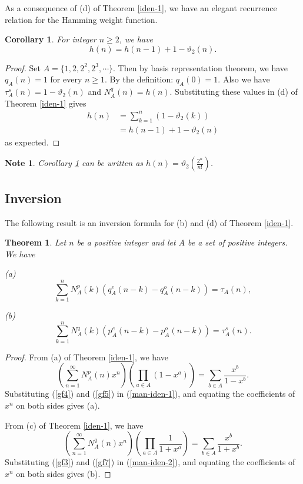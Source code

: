 \documentclass[11pt]{article}
\newtheorem{theorem}{Theorem}
\newtheorem{corollary}{Corollary}
\newtheorem{note}{Note}
\begin{document}
As a consequence of (d) of Theorem \ref{iden-1}, we have an elegant recurrence relation for the Hamming weight function.
\begin{corollary}\label{ham-rec}
For integer $n\geq 2$, we have
\begin{equation}
h(n)=h(n-1)+1-\vartheta_2(n).
\end{equation}
\end{corollary}
\begin{proof}
Set $A=\{1,2,2^2,2^3,\cdots \}$. Then by basis representation theorem, we have $q_A(n)=1$ for every $n\geq 1$. By the definition: $q_A(0)=1$. Also we have $\tau_A^s(n)=1-\vartheta_2(n)$ and $N_A^q(n)=h(n)$. Substituting these values in (d) of Theorem \ref{iden-1} gives 
\begin{align*}
h(n)&=\sum_{k=1}^{n}(1-\vartheta_2(k))\\
&=h(n-1)+1-\vartheta_2(n)
\end{align*}
as expected. 
\end{proof}
\begin{note}
Corollary \ref{ham-rec} can be written as $h(n)=\vartheta_2\left(\frac{2^{n}}{n!}\right)$.
\end{note}
\subsection{ Inversion}
The following result is an inversion formula for (b) and (d) of Theorem \ref{iden-1}.
\begin{theorem}\label{iden-2}
Let $n$ be a positive integer and let $A$ be a set of positive integers. We have 
\begin{description}
\item{(a)}
\begin{equation}
\sum_{k=1}^{n}N^p_A(k)\left(q_A^e(n-k)-q_A^o(n-k)\right)=\tau_A(n),
\end{equation}
\item{(b)}
\begin{equation}
\sum_{k=1}^nN^q_A(k)\left(p_A^e(n-k)-p_A^o(n-k)\right)=\tau_A^s(n).
\end{equation}
\end{description}
\end{theorem}
\begin{proof}
From (a) of Theorem \ref{iden-1}, we have
\begin{equation}\label{man-iden-1}
\left(\sum_{n=1}^{\infty}N^p_A(n)x^n\right)\left(\prod_{a\in A}(1-x^a)\right)=\sum_{b\in A}\frac{x^b}{1-x^b}.
\end{equation}
Substituting (\ref{gf4}) and (\ref{gf5}) in (\ref{man-iden-1}), and equating the coefficients of $x^n$ on both sides gives (a). 

From (c) of Theorem \ref{iden-1}, we have
\begin{equation}\label{man-iden-2}
\left(\sum_{n=1}^{\infty}N^q_A(n)x^n\right)\left(\prod_{a\in A}\frac{1}{1+x^a}\right)=\sum_{b\in A}\frac{x^b}{1+x^b}.
\end{equation}
Substituting (\ref{gf3}) and (\ref{gf7}) in (\ref{man-iden-2}), and equating the coefficients of $x^n$ on both sides gives (b). 
\end{proof}
\end{document}
